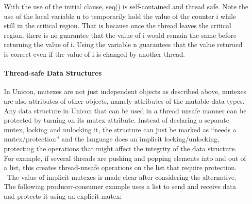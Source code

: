 With the use of the initial clause, \textsf{seq()} is
self-contained and thread safe. Note the use of the local variable
\textsf{n} to temporarily hold the value of the counter
\textsf{i} while still in the critical region. That is
because once the thread leaves the critical region, there is no
guarantee that the value of \textsf{i} would remain the same
before returning the value of \textsf{i}. Using the variable
\textsf{n} guarantees that the value returned is correct
even if the value of \textsf{i} is changed by another
thread.

\paragraph[Thread{}-safe Data Structures]{Thread-safe Data Structures}
In Unicon, mutexes are not just independent objects as described above,
mutexes are also attributes of other objects, namely attributes of the
mutable data types. Any data structure in Unicon that can be used in a
thread unsafe manner can be protected by turning on its mutex
attribute. Instead of declaring a separate mutex, locking and unlocking
it, the structure can just be marked as {\textquotedblleft}needs a
mutex/protection{\textquotedblright} and the language does an implicit
locking/unlocking, protecting the operations that might affect the
integrity of the data structure. For example, if several threads are
pushing and popping elements into and out of a list, this creates
thread-unsafe operations on the list that require protection. \ The
value of implicit mutexes is made clear after considering the
alternative. The following producer-consumer example uses a list to
send and receive data and protects it using an explicit mutex: 


